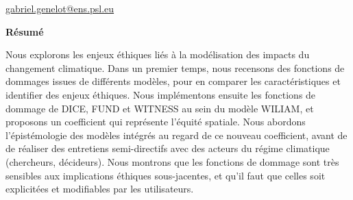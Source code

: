 \begin{titlepage}

\begin{center}

{\makeatletter
\largetitlestyle\fontsize{45}{45}\selectfont\@title
\makeatother}

{\makeatletter
\ifdefvoid{\@subtitle}{}{\bigskip\titlestyle\fontsize{20}{20}\selectfont\@subtitle}
\makeatother}


\bigskip
\bigskip

{\makeatletter
\largetitlestyle\fontsize{25}{25}\selectfont\@author
\makeatother}

\bigskip

\href{mailto:gabriel.genelot@ens.psl.eu}{gabriel.genelot@ens.psl.eu}

\bigskip
\bigskip


\vfill

\textbf{Résumé} \\

\begin{center}
\justify


Nous explorons les enjeux éthiques liés à la modélisation des impacts du changement climatique. Dans un premier temps, nous recensons des fonctions de dommages issues de différents modèles, pour en comparer les caractéristiques et identifier des enjeux éthiques. Nous implémentons ensuite les fonctions de dommage de DICE, FUND et WITNESS au sein du modèle WILIAM, et proposons un coefficient qui représente l'équité spatiale. Nous abordons l'épistémologie des modèles intégrés au regard de ce nouveau coefficient, avant de de réaliser des entretiens semi-directifs avec des acteurs du régime climatique (chercheurs, décideurs). Nous montrons que les fonctions de dommage sont très sensibles aux implications éthiques sous-jacentes, et qu'il faut que celles soit explicitées et modifiables par les utilisateurs. 

\end{center}


\bigskip

\bigskip


\end{center}
\end{titlepage}
